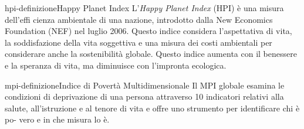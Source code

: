 \documentclass[preview]{standalone}
\begin{document}
\begin{snippetdefinition}{hpi-definizione}{Happy Planet Index}
    L'\textit{Happy Planet Index} (HPI) è una misura dell'effi cienza ambientale di una nazione,
    introdotto dalla New Economics Foundation
    (NEF) nel luglio 2006. Questo indice considera l'aspettativa di vita, la soddisfazione
    della vita soggettiva e una misura dei costi ambientali per considerare
    anche la sostenibilità globale.
    Questo indice aumenta con il benessere e la speranza di vita,
    ma diminuisce con l'impronta ecologica.
\end{snippetdefinition}


\begin{snippetdefinition}{mpi-definizione}{Indice di Povertà Multidimensionale}
    Il MPI globale esamina le condizioni
    di deprivazione di una persona attraverso 10 indicatori relativi alla salute,
    all'istruzione e al tenore di vita e offre uno strumento per identificare chi è po-
    vero e in che misura lo è.
\end{snippetdefinition}
\end{document}
